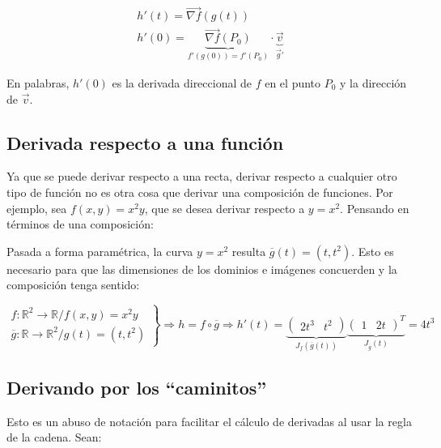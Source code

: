 \documentclass{article}
\renewcommand{\Bbb}{\mathbb}
\begin{document}
\begin{subequations}
\begin{gather}
h'(t) = \overrightarrow{\nabla{f}}(g(t))  \\
h'(0) = \underbrace{ \overrightarrow{\nabla{f}}(P_0) }_{f'(g(0)) = f'(P_0)} \cdot \underbrace{ \overrightarrow{v} }_{ \overrightarrow{g}' }
\end{gather}
\end{subequations}

En palabras, $h'(0)$ es la derivada direccional de $f$ en el punto $P_0$ y la dirección de $\overrightarrow{v}$.

\subsection{Derivada respecto a una función}

Ya que se puede derivar respecto a una recta, derivar respecto a cualquier otro tipo de función no es otra cosa que derivar una composición de funciones. Por ejemplo, sea $f(x,y) = x^2 y$, que se desea derivar respecto a $y = x^2$. Pensando en términos de una composición:

Pasada a forma paramétrica, la curva $y = x^2$ resulta $\overline{g}(t) = (t, t^2)$. Esto es necesario para que las dimensiones de los dominios e imágenes concuerden y la composición tenga sentido:

\begin{equation}
\left.
\begin{array}{ll}
f:\Bbb R^2 \rightarrow \Bbb R / f(x,y) = x^2 y \\
\overline{g}: \Bbb R \rightarrow \Bbb R^2 / g(t) = (t, t^2)
\end{array}
\right\} \Rightarrow h = f \circ \overline{g} \Rightarrow h'(t) = \underbrace{ \left( \begin{matrix}2t^3 & t^2\end{matrix} \right) }_{J_f(\overline{g}(t))} \underbrace{ \left( \begin{matrix}1 & 2t\end{matrix} \right)^T }_{J_{\overline{g}}(t)} = 4t^3
\end{equation}

\subsection{Derivando por los ``caminitos''}

Esto es un abuso de notación para facilitar el cálculo de derivadas al usar la regla de la cadena.
Sean:
\end{document}
